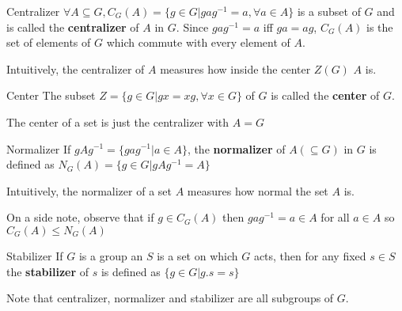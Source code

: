 \documentclass[titlepage, 12pt]{article}
\begin{document}
\begin{definition}{Centralizer}{}
    $\forall A\subseteq G, C_G(A) = \{g\in G| gag^{-1} = a,\forall a\in A\}$ is
    a subset of $G$ and is called the \textbf{centralizer} of $A$ in $G$. Since
    $gag^{-1} = a$ iff $ga = ag$, $C_G(A)$ is the set of elements of $G$ which
    commute with every element of $A$.
\end{definition}
Intuitively, the centralizer of $A$ measures how inside the center $Z(G)$ $A$
is.

\begin{definition}{Center}{}
    The subset $Z = \{g\in G| gx = xg,\forall x\in G\}$ of $G$ is called the
    \textbf{center} of $G$.
\end{definition}
The center of a set is just the centralizer with $A = G$

\begin{definition}{Normalizer}{}
    If $gAg^{-1} = \{gag^{-1}| a\in A\}$, the \textbf{normalizer}  of $A
    (\subseteq G)$ in $G$ is defined as $N_G(A) = \{g\in G| gAg^{-1} = A \}$
\end{definition}
Intuitively, the normalizer of a set $A$ measures how normal the set $A$ is.


On a side note, observe that if $g\in C_G(A)$ then $gag^{-1} = a\in A$ for all
$a\in A$ so $C_G(A)\le N_G(A)$

\begin{definition}{Stabilizer}{}
    If $G$ is a group an $S$ is a set on which $G$ acts, then for any fixed
    $s\in S$ the \textbf{stabilizer} of $s$ is defined as $\{g\in G| g.s=s\}$
\end{definition}
Note that centralizer, normalizer and stabilizer are all subgroups of $G$.
\end{document}

